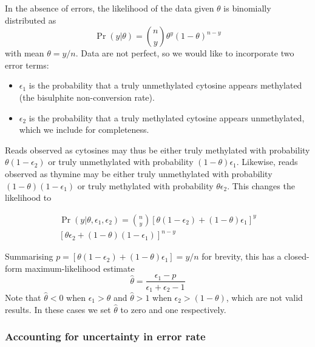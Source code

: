 \documentclass[10pt,letterpaper]{article}
\begin{document}
In the absence of errors, the likelihood of the data given $\theta$ is binomially distributed as
\begin{equation}
    \label{eqn:classic-binomial}
    \Pr(y| \theta) = {n \choose y} \theta^y(1-\theta)^{n-y}
\end{equation}
with mean $\theta=y/n$.
Data are not perfect, so we would like to incorporate two error terms:
\begin{itemize}
    \item $\epsilon_1$ is the probability that a truly unmethylated cytosine appears methylated (the bisulphite non-conversion rate).
    \item $\epsilon_2$ is the probability that a truly methylated cytosine appears unmethylated, which we include for completeness.
\end{itemize}
Reads observed as cytosines may thus be either truly methylated with probability $\theta(1-\epsilon_2)$ or truly unmethylated with probability $(1-\theta)\epsilon_1$. Likewise, reads observed as thymine may be either truly unmethylated with probability $(1-\theta)(1-\epsilon_1)$ or truly methylated with probability $\theta \epsilon_2$.
This changes the likelihood to

\begin{equation}
\begin{split}
    \label{eqn:binom-with-errors}
    \Pr(y | \theta, \epsilon_1, \epsilon_2) = 
    {n \choose y}
    [\theta(1-\epsilon_2) + (1-\theta)\epsilon_1]^y \\
    [\theta \epsilon_2 + (1-\theta)(1-\epsilon_1)]^{n-y}
\end{split}
\end{equation}

Summarising $p=[\theta(1-\epsilon_2) + (1-\theta)\epsilon_1] = y/n$ for brevity, this has a closed-form maximum-likelihood estimate
\begin{equation}
    \label{eqn:ml-theta}
    \hat{\theta} = \frac{\epsilon_1-p}{\epsilon_1 + \epsilon_2 -1}
\end{equation}
Note that $\hat{\theta}<0$ when $\epsilon_1 > \theta$ and $\hat{\theta}>1$ when $\epsilon_2 > (1-\theta)$, which are not valid results.
In these cases we set $\hat{\theta}$ to zero and one respectively.

\subsubsection*{Accounting for uncertainty in error rate} \label{sec:mean-as-beta}
\end{document}
